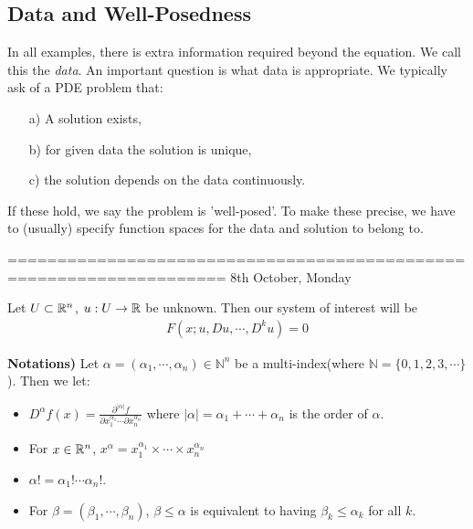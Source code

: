 \documentclass[10pt,a4paper]{report}
\begin{document}
\subsection*{Data and Well-Posedness}
In all examples, there is extra information required beyond the equation. We call this the \emph{data}. An important question is what data is appropriate. We typically ask of a PDE problem that:
\begin{itemize}
\item[a)] A solution exists,
\item[b)] for given data the solution is unique,
\item[c)] the solution depends on the data continuously.
\end{itemize}
If these hold, we say the problem is 'well-posed'. To make these precise, we have to (usually) specify function spaces for the data and solution to belong to.
\s

====================================================================
8th October, Monday
\s

Let $U \subset \mathbb{R}^n$, $u: U \rightarrow \mathbb{R}$ be unknown. Then our system of interest will be
\begin{align}
F(x; u,Du,\cdots, D^k u)=0 \label{thePDE}
\end{align}
\s

\textbf{Notations) } Let $\alpha = (\alpha_1, \cdots, \alpha_n) \in \mathbb{N}^n$ be a multi-index(where $\mathbb{N} =\{ 0,1,2,3,\cdots\}$). Then we let:
\begin{itemize}
\item $D^{\alpha}f(x) = \frac{\partial^{| \alpha |} f}{\partial x_1^{\alpha_1} \cdots \partial x_n^{\alpha_n}}$ where $|\alpha| = \alpha_1 + \cdots + \alpha_n$ is the order of $\alpha$.
\item For $x \in \mathbb{R}^n$, $x^{\alpha} = x_1^{\alpha_1} \times \cdots \times x_n^{\alpha_n}$
\item $\alpha! = \alpha_1! \cdots \alpha_n!$.
\item For $\beta = (\beta_1, \cdots, \beta_n)$, $\beta \leq \alpha$ is equivalent to having $\beta_k \leq \alpha_k$ for all $k$.
\end{itemize}
\s
\end{document}
